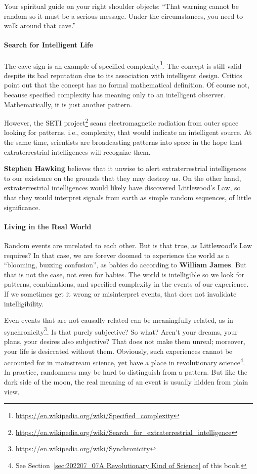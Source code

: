 Your spiritual guide on your right shoulder objects: “That warning cannot be random so it must be a serious message.
Under the circumstances, you need to walk around that cave.”

\paragraph{Search for Intelligent Life}
The cave sign is an example of specified complexity\footnote{\url{https://en.wikipedia.org/wiki/Specified_complexity}}. The concept is still valid despite its bad reputation due to its
association with intelligent design. Critics point out that the concept has no formal mathematical definition. Of
course not, because specified complexity has meaning only to an intelligent observer. Mathematically, it is just
another pattern.

However, the SETI project\footnote{\url{https://en.wikipedia.org/wiki/Search_for_extraterrestrial_intelligence}} scans electromagnetic radiation from outer space looking for patterns, i.e., complexity, that
would indicate an intelligent source. At the same time, scientists are broadcasting patterns into space in the hope
that extraterrestrial intelligences will recognize them.

\textbf{Stephen Hawking} believes that it unwise to alert extraterrestrial intelligences to our existence on the grounds
that they may destroy us. On the other hand, extraterrestrial intelligences would likely have discovered
Littlewood's Law, so that they would interpret signals from earth as simple random sequences, of little
significance.

\paragraph{Living in the Real World}
Random events are unrelated to each other. But is that true, as Littlewood's Law requires? In that case, we
are forever doomed to experience the world as a “blooming, buzzing confusion”, as babies do according to
\textbf{William James}. But that is not the case, not even for babies. The world is intelligible so we look for
patterns, combinations, and specified complexity in the events of our experience. If we sometimes get it wrong or
misinterpret events, that does not invalidate intelligibility.

Even events that are not causally related can be meaningfully related, as in synchronicity\footnote{\url{https://en.wikipedia.org/wiki/Synchronicity}}. Is that purely subjective?
So what? Aren't your dreams, your plans, your desires also subjective? That does not make them unreal;
moreover, your life is desiccated without them. Obviously, such experiences cannot be accounted for in mainstream
science, yet have a place in revolutionary science\footnote{See Section~\ref{sec:202207_07A Revolutionary Kind of Science} of this book.}. In practice, randomness may be hard to distinguish from a pattern.
But like the dark side of the moon, the real meaning of an event is usually hidden from plain view.

